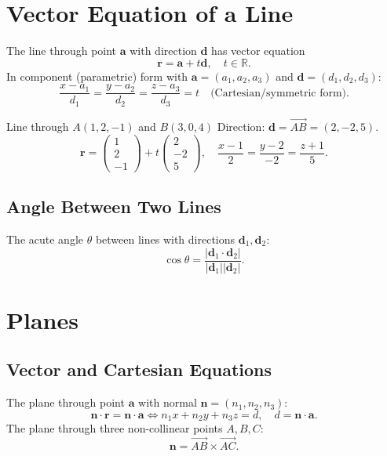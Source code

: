 \documentclass[12pt,a4paper]{article}
\theoremstyle{defstyle}
\newcommand{\R}{\mathbb{R}}
\begin{document}
\section{Vector Equation of a Line}

\begin{result}{}{}
The line through point \(\mathbf{a}\) with direction \(\mathbf{d}\) has vector equation
\[
  \mathbf{r} = \mathbf{a} + t\mathbf{d},\quad t\in\R.
\]
In component (parametric) form with \(\mathbf{a}=(a_1,a_2,a_3)\) and \(\mathbf{d}=(d_1,d_2,d_3)\):
\[
  \frac{x-a_1}{d_1}=\frac{y-a_2}{d_2}=\frac{z-a_3}{d_3}=t\quad\text{(Cartesian/symmetric form)}.
\]
\end{result}

\begin{example}{Line through $A(1,2,-1)$ and $B(3,0,4)$}{}
Direction: \(\mathbf{d}=\overrightarrow{AB}=(2,-2,5)\).
\[
  \mathbf{r}=\begin{pmatrix}1\\2\\-1\end{pmatrix}+t\begin{pmatrix}2\\-2\\5\end{pmatrix},\quad
  \frac{x-1}{2}=\frac{y-2}{-2}=\frac{z+1}{5}.
\]
\end{example}

\subsection{Angle Between Two Lines}

The acute angle \(\theta\) between lines with directions \(\mathbf{d}_1,\mathbf{d}_2\):
\[
  \cos\theta = \frac{|\mathbf{d}_1\cdot\mathbf{d}_2|}{|\mathbf{d}_1||\mathbf{d}_2|}.
\]

\section{Planes}

\subsection{Vector and Cartesian Equations}

\begin{result}{}{}
The plane through point \(\mathbf{a}\) with normal \(\mathbf{n}=(n_1,n_2,n_3)\):
\[
  \mathbf{n}\cdot\mathbf{r} = \mathbf{n}\cdot\mathbf{a} \iff n_1x+n_2y+n_3z=d,\quad d=\mathbf{n}\cdot\mathbf{a}.
\]
The plane through three non-collinear points \(A,B,C\):
\[
  \mathbf{n} = \overrightarrow{AB}\times\overrightarrow{AC}.
\]
\end{result}
\end{document}
